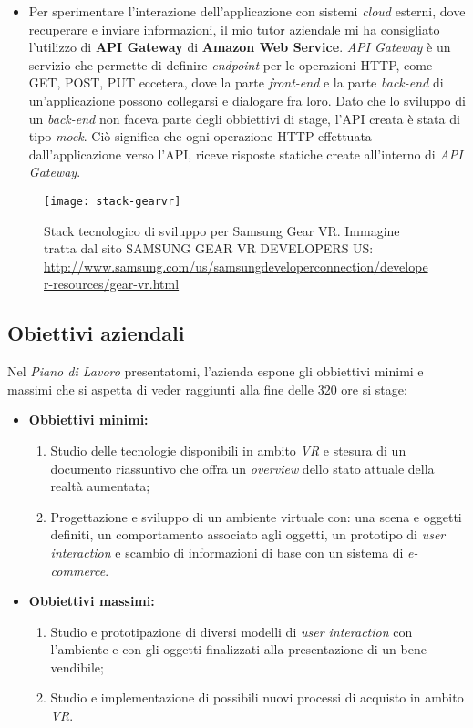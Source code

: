 \begin{itemize}
	\item Per sperimentare l'interazione dell'applicazione con sistemi \textit{cloud} esterni, dove recuperare e inviare informazioni, il mio tutor aziendale mi ha consigliato l'utilizzo di \textbf{API Gateway} di \textbf{Amazon Web Service}. \textit{API Gateway} è un servizio che permette di definire \textit{endpoint} per le operazioni HTTP, come GET, POST, PUT eccetera, dove la parte \textit{front-end} e la parte \textit{back-end} di un'applicazione possono collegarsi e dialogare fra loro. Dato che lo sviluppo di un \textit{back-end} non faceva parte degli obbiettivi di stage, l'API creata è stata di tipo \textit{mock}. Ciò significa che ogni operazione HTTP effettuata dall'applicazione verso l'API, riceve risposte statiche create all'interno di \textit{API Gateway}. 
\end{itemize}

\label{Stack Gear VR}
\begin{figure}[ht]
	\begin{center}
		\texttt{[image: stack-gearvr]}
		\caption{Stack tecnologico di sviluppo per Samsung Gear VR. Immagine tratta dal sito SAMSUNG GEAR VR DEVELOPERS US: \url{http://www.samsung.com/us/samsungdeveloperconnection/developer-resources/gear-vr.html}}
	\end{center}
\end{figure}
\FloatBarrier

\hypertarget{2.2.2}{\subsection{Obiettivi aziendali}}

Nel \textit{Piano di Lavoro} presentatomi, l'azienda espone gli obbiettivi minimi e massimi che si aspetta di veder raggiunti alla fine delle 320 ore si stage:

\begin{itemize}
	\item \textbf{Obbiettivi minimi:}
	\begin{enumerate}
		\item Studio delle tecnologie disponibili in ambito \textit{VR} e stesura di un documento riassuntivo che offra un \textit{overview} dello stato attuale della realtà aumentata;
		\item Progettazione e sviluppo di un ambiente virtuale con: una scena e oggetti definiti, un comportamento associato agli oggetti, un prototipo di \textit{user interaction} e scambio di informazioni di base con un sistema di \textit{e-commerce}.
	\end{enumerate}
	\item \textbf{Obbiettivi massimi:}
	\begin{enumerate}
		\item Studio e prototipazione di diversi modelli di \textit{user interaction} con l'ambiente e con gli oggetti finalizzati alla presentazione di un bene vendibile;
		\item Studio e implementazione di possibili nuovi processi di acquisto in ambito \textit{VR}. 
	\end{enumerate}
\end{itemize}

